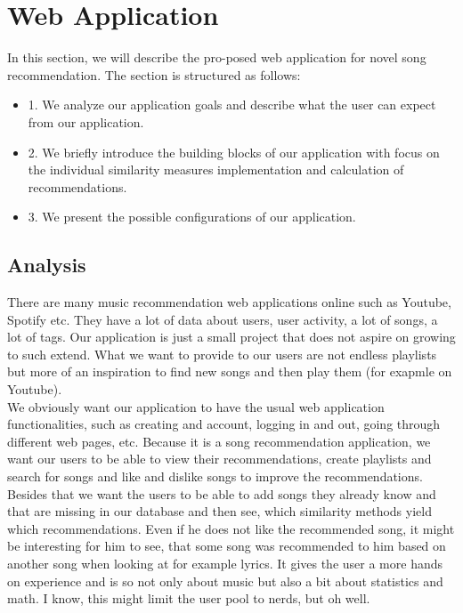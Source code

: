 \chapter{Web Application}

In this section, we will describe the pro-posed web application for novel song recommendation.  The section is structured as follows: 
\begin{itemize}
    \item 1. We analyze our application goals and describe what the user can expect from our application.
    \item 2. We briefly introduce the building blocks of our application with focus on the individual similarity measures implementation and calculation of recommendations.
    \item 3. We present the possible configurations of our application.
\end{itemize}

\section{Analysis}

There are many music recommendation web applications online such as Youtube, Spotify etc. They have a lot of data about users, user activity, a lot of songs, a lot of tags. Our application is just a small project that does not aspire on growing to such extend. What we want to provide to our users are not endless playlists but more of an inspiration to find new songs and then play them (for exapmle on Youtube). \\
We obviously want our application to have the usual web application functionalities, such as creating and account, logging in and out, going through different web pages, etc. Because it is a song recommendation application, we want our users to be able to view their recommendations, create playlists and search for songs and like and dislike songs to improve the recommendations. Besides that we want the users to be able to add songs they already know and that are missing in our database and then see, which similarity methods yield which recommendations. Even if he does not like the recommended song, it might be interesting for him to see, that some song was recommended to him based on another song when looking at for example lyrics. It gives the user a more hands on experience and is so not only about music but also a bit about statistics and math. I know, this might limit the user pool to nerds, but oh well.\\

